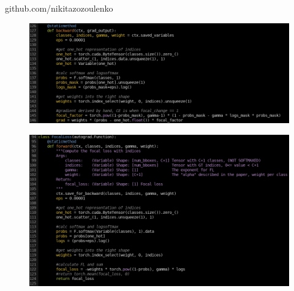 \documentclass[17pt]{extarticle}
\begin{document}
\begin{center}
{\fontsize{70}{20}\selectfont github.com/nikitazozoulenko}
\end{center}
\begin{figure}
\begin{minipage}{.5\textwidth}
  	\includegraphics[scale=0.88]{focalback.png}
\end{minipage}
\end{figure}

\begin{figure}
\begin{minipage}{.5\textwidth}
  	\includegraphics[scale=0.88]{focalforward.png}
\end{minipage}
\end{figure}
\end{document}
